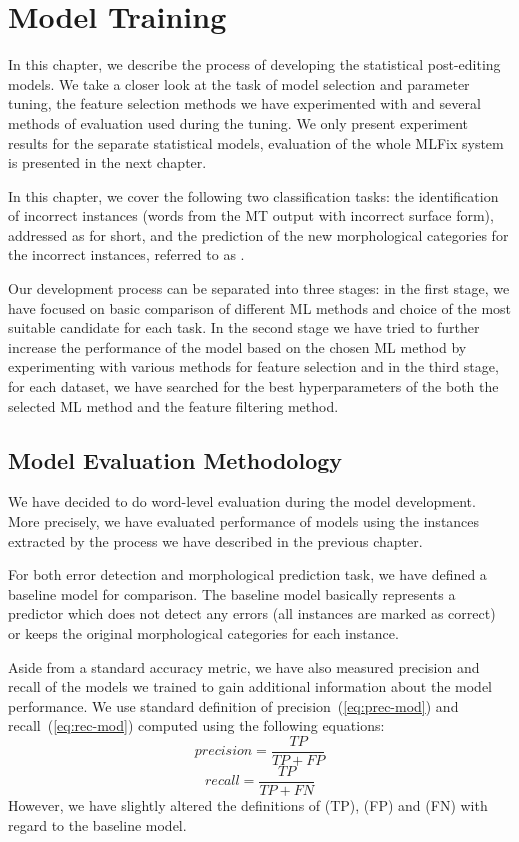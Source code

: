 \chapter{Model Training}
\label{chap:tuning}

In this chapter, we describe the process of developing
the statistical post-editing models. We take a closer look at the task of model
selection and parameter tuning, the feature selection methods we have experimented
with and several methods of evaluation used during the tuning.
We only present experiment results for the separate statistical models,
evaluation of the whole MLFix system is presented in the next chapter.

In this chapter, we cover the following two classification tasks: the identification
of incorrect instances (words from the MT output with incorrect surface form),
addressed as  for short,
and the prediction of the new morphological categories for the incorrect instances,
referred to as .

Our development process can be separated into three stages: in the first stage, we
have focused on basic comparison of different ML methods and choice of the most
suitable candidate for each task.
In the second stage we have tried to further increase the performance of the model
based on the chosen ML method by experimenting with various methods for feature selection
and in the third stage, for each dataset, we have searched for the best hyperparameters
of the both the selected ML method and the feature filtering method.

\section{Model Evaluation Methodology}

We have decided to do word-level evaluation during the model development. More precisely,
we have evaluated performance of models using the instances extracted by the
process we have described in the previous chapter.

For both error detection and morphological prediction task, we have defined
a baseline model for comparison. The baseline model basically represents a predictor which
does not detect any errors (all instances are marked as correct) or keeps the original
morphological categories for each instance.

Aside from a standard accuracy metric, we have also measured
precision and recall
of the models we trained to gain additional information about the model performance.
We use standard definition of precision~(\ref{eq:prec-mod}) and recall~(\ref{eq:rec-mod}) computed using the following equations:
\begin{equation} \label{eq:prec-mod}
precision = \frac{TP}{TP + FP}
\end{equation}
\begin{equation} \label{eq:rec-mod}
recall = \frac{TP}{TP + FN}
\end{equation}
However, we have slightly altered the definitions of  (TP),
 (FP) and  (FN)
with regard to the baseline model.

